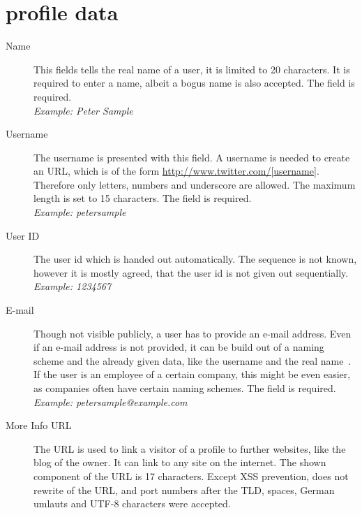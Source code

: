 \chapter{\Twitter{} profile data}
\label{chap:twitter_profile_data}

\begin{description}
\item[Name] This fields tells the real name of a user, it is limited to 20
            characters. It is required to enter a name, albeit a bogus name is
            also accepted. The field is required.\\
            \textit{Example: Peter Sample}
\item[Username] The username is presented with this field. A username is needed
                to create an URL, which is of the form \url{http://www.twitter.com/[username]}.
                Therefore only letters, numbers and underscore are allowed. The maximum length
                is set to 15 characters. The field is required.\\
                \textit{Example: petersample}
\item[User ID] The user id which is handed out automatically. The sequence is
               not known, however it is mostly agreed, that the user id is not given out
               sequentially.\\
               \textit{Example: 1234567}
\item[E-mail] Though not visible publicly, a \Twitter{} user has to provide an
              e-mail address. Even if an e-mail address is not provided, it
              can be build out of a naming scheme and the already
              given data, like the username and the real name~\cite{brown2008}. If the user
              is an employee of a certain company, this might be even easier,
              as companies often have certain naming schemes. The field is required.\\
              \textit{Example: petersample@example.com}
\item[More Info URL] The URL is used to link a visitor of a profile to further
                     websites, like the blog of the owner. It can link to
                     any site on the internet. The shown component of the
                     URL is 17 characters. Except XSS prevention,
                     \Twitter{} does not rewrite of the URL, and port numbers
                     after the TLD, spaces, German umlauts and UTF-8 characters were
                     accepted.\\

\end{description}
